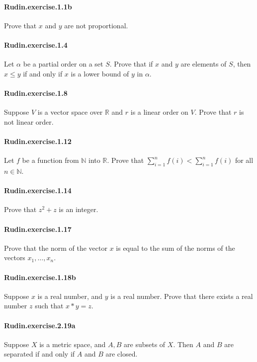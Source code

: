 \documentclass{article}
\begin{document}
\paragraph{Rudin.exercise.1.1b} Prove that $x$ and $y$ are not proportional.

\paragraph{Rudin.exercise.1.4} Let $α$ be a partial order on a set $S$. Prove that if $x$ and $y$ are elements of $S$, then $x ≤ y$ if and only if $x$ is a lower bound of $y$ in $α$.

\paragraph{Rudin.exercise.1.8} Suppose $V$ is a vector space over $\mathbb{R}$ and $r$ is a linear order on $V$. Prove that $r$ is not linear order.

\paragraph{Rudin.exercise.1.12} Let $f$ be a function from $\mathbb{N}$ into $\mathbb{R}$. Prove that $\sum_{i=1}^n f(i) < \sum_{i=1}^n f(i)$ for all $n \in \mathbb{N}$.

\paragraph{Rudin.exercise.1.14} Prove that $z^2 + z$ is an integer.

\paragraph{Rudin.exercise.1.17} Prove that the norm of the vector $x$ is equal to the sum of the norms of the vectors $x_1, \dots, x_n$.

\paragraph{Rudin.exercise.1.18b} Suppose $x$ is a real number, and $y$ is a real number. Prove that there exists a real number $z$ such that $x * y = z$.

\paragraph{Rudin.exercise.2.19a} Suppose $X$ is a metric space, and $A, B$ are subsets of $X$. Then $A$ and $B$ are separated if and only if $A$ and $B$ are closed.
\end{document}
